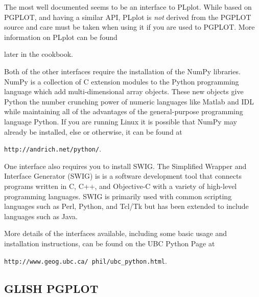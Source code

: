 \documentclass[twoside,11pt]{article}
\newcommand{\htmladdnormallink}[2]{#1}
\newcommand{\htmlref}[2]{#1}
\newcommand{\xlabel}[1]{}
\begin{document}
The most well documented seems to be an interface to \htmladdnormallink{PLplot}{http://emma.la.asu.edu/plplot/}. While based on PGPLOT, and having a similar API, PLplot is {\em not} derived from the PGPLOT source and care must be taken when using it if you are used to PGPLOT. More information on PLplot can be found 
\begin{htmlonly}
\htmlref{later}{sc15_plplot} in the cookbook.
\end{htmlonly}

Both of the other interfaces require the installation of the \htmladdnormallink{NumPy}{http://www.python.org/topics/scicomp/numpy.html}
libraries. NumPy is a collection of C extension modules to the Python programming language which add  multi-dimensional array objects. These new objects give Python the number crunching power of numeric languages like Matlab and IDL while maintaining all of the advantages of the general-purpose programming language Python. If you are running Linux it is possible that NumPy may already be installed, else or otherwise, it can be found at 
\begin{htmlonly} \htmladdnormallink{{\tt http://andrich.net/python/}}{http://andrich.net/python/}.
\end{htmlonly} 

One interface also requires you to install \htmladdnormallink{SWIG}{http://www.swig.org/}. The Simplified Wrapper and Interface Generator (SWIG) is is a software development tool that connects programs written in C, C++, and Objective-C with a variety of high-level programming languages. SWIG is primarily used with common scripting languages such as Perl, Python, and Tcl/Tk but has been extended to include languages such as Java.

More details of the interfaces available, including some basic usage and installation instructions, can be found on the UBC Python Page at 
\begin{htmlonly} \htmladdnormallink{{\tt http://www.geog.ubc.ca/~phil/ubc_python.html}}{http://www.geog.ubc.ca/~phil/ubc_python.html}.
\end{htmlonly}

\subsection{\xlabel{sc15_pgglish}GLISH PGPLOT\label{sc15_pgglish}}
\end{document}

